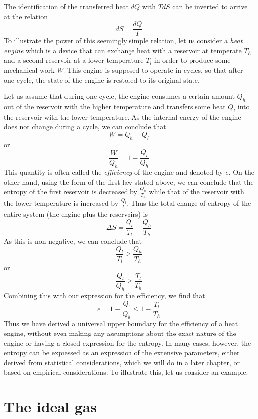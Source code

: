 \documentclass[a4paper, draft]{report}
\numberwithin{section}{chapter}
\numberwithin{equation}{chapter}
\theoremstyle{own}
\theoremstyle{remark}
\begin{document}
The identification of the transferred heat $dQ $ with $TdS$ can be inverted to arrive at the relation 
$$
dS = \frac{dQ}{T}
$$
To illustrate the power of this seemingly simple relation, let us consider a {\em heat engine} which is a device that can exchange heat with a reservoir at temperate $T_h$ and a second reservoir at a lower temperature $T_l$ in order to produce some mechanical work $W$. This engine is supposed to operate in cycles, so that after one cycle, the state of the engine is restored to its original state. 

Let us assume that during one cycle, the engine consumes a certain amount $Q_h$ out of the reservoir with the higher temperature and transfers some heat $Q_l$ into the reservoir with the lower temperature. As the internal energy of the engine does not change during a cycle, we can conclude that
$$
W = Q_h - Q_l
$$
or 
$$
\frac{W}{Q_h} = 1 - \frac{Q_l}{Q_h}
$$
This quantity is often called the {\em efficiency} of the engine and denoted by $e$. On the other hand, using the form of the first law stated above, we can conclude that the entropy of the first reservoir is decreased by $\frac{Q_h}{T_h}$ while that of the reservoir with the lower temperature is increased by $\frac{Q_l}{T_l}$.
Thus the total change of entropy of the entire system (the engine plus the reservoirs) is
$$
\Delta S = \frac{Q_l}{T_l} - \frac{Q_h}{T_h}
$$
As this is non-negative, we can conclude that
$$
\frac{Q_l}{T_l} \geq \frac{Q_h}{T_h}
$$
or
$$
\frac{Q_l}{Q_h} \geq \frac{T_l}{T_h}
$$
Combining this with our expression for the efficiency, we find that
$$
e = 1 - \frac{Q_l}{Q_h} \leq 1 - \frac{T_l}{T_h}
$$
Thus we have derived a universal upper boundary for the efficiency of a heat engine, without even making any assumptions about the exact nature of the engine or having a closed expression for the entropy. In many cases, however, the entropy can be expressed as an expression of the extensive parameters, either derived from statistical considerations, which we will do in a later chapter, or based on empirical considerations. To illustrate this, let us consider an example.

\section{The ideal gas}
\end{document}
